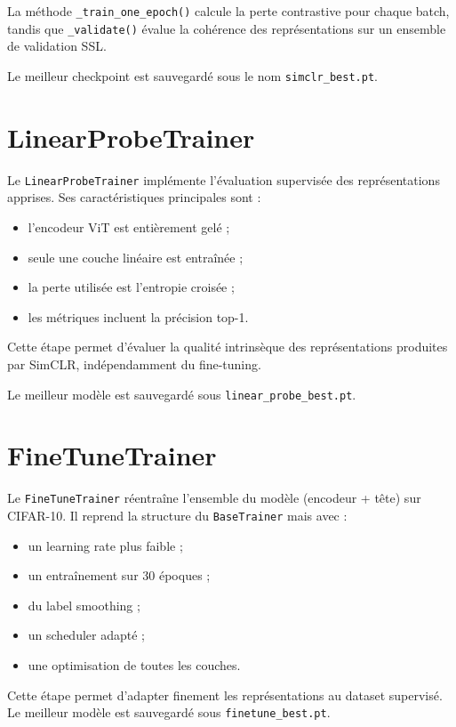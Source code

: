 \documentclass[12pt,a4paper]{report}
\begin{document}
	La méthode \texttt{\_train\_one\_epoch()} calcule la perte contrastive pour chaque batch, tandis que \texttt{\_validate()} évalue la cohérence des représentations sur un ensemble de validation SSL.
	
	Le meilleur checkpoint est sauvegardé sous le nom \texttt{simclr\_best.pt}.
	
	\section{LinearProbeTrainer}
	
	Le \texttt{LinearProbeTrainer} implémente l’évaluation supervisée des représentations apprises. Ses caractéristiques principales sont :
	
	\begin{itemize}
		\item l’encodeur ViT est entièrement gelé ;
		\item seule une couche linéaire est entraînée ;
		\item la perte utilisée est l’entropie croisée ;
		\item les métriques incluent la précision top-1.
	\end{itemize}
	
	Cette étape permet d’évaluer la qualité intrinsèque des représentations produites par SimCLR, indépendamment du fine-tuning.
	
	Le meilleur modèle est sauvegardé sous \texttt{linear\_probe\_best.pt}.
	
	\section{FineTuneTrainer}
	
	Le \texttt{FineTuneTrainer} réentraîne l’ensemble du modèle (encodeur + tête) sur CIFAR-10. Il reprend la structure du \texttt{BaseTrainer} mais avec :
	
	\begin{itemize}
		\item un learning rate plus faible ;
		\item un entraînement sur 30 époques ;
		\item du label smoothing ;
		\item un scheduler adapté ;
		\item une optimisation de toutes les couches.
	\end{itemize}
	
	Cette étape permet d’adapter finement les représentations au dataset supervisé. Le meilleur modèle est sauvegardé sous \texttt{finetune\_best.pt}.
	
\end{document}
